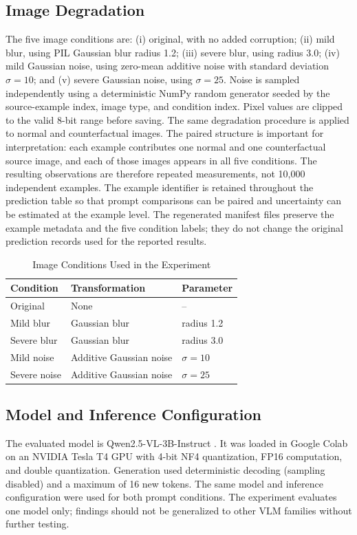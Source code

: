 \documentclass[conference]{IEEEtran}
\begin{document}
\subsection{Image Degradation}
The five image conditions are: (i) original, with no added corruption; (ii) mild blur, using PIL Gaussian blur radius 1.2; (iii) severe blur, using radius 3.0; (iv) mild Gaussian noise, using zero-mean additive noise with standard deviation $\sigma=10$; and (v) severe Gaussian noise, using $\sigma=25$. Noise is sampled independently using a deterministic NumPy random generator seeded by the source-example index, image type, and condition index. Pixel values are clipped to the valid 8-bit range before saving. The same degradation procedure is applied to normal and counterfactual images. The paired structure is important for interpretation: each example contributes one normal and one counterfactual source image, and each of those images appears in all five conditions. The resulting observations are therefore repeated measurements, not 10,000 independent examples. The example identifier is retained throughout the prediction table so that prompt comparisons can be paired and uncertainty can be estimated at the example level. The regenerated manifest files preserve the example metadata and the five condition labels; they do not change the original prediction records used for the reported results.

\begin{table}[t]
\caption{Image Conditions Used in the Experiment}
\label{tab:conditions}
\centering
\footnotesize
\begin{tabular}{lll}
\toprule
Condition & Transformation & Parameter \\
\midrule
Original & None & -- \\
Mild blur & Gaussian blur & radius 1.2 \\
Severe blur & Gaussian blur & radius 3.0 \\
Mild noise & Additive Gaussian noise & $\sigma=10$ \\
Severe noise & Additive Gaussian noise & $\sigma=25$ \\
\bottomrule
\end{tabular}
\end{table}

\subsection{Model and Inference Configuration}
The evaluated model is Qwen2.5-VL-3B-Instruct \cite{bai2025qwen}. It was loaded in Google Colab on an NVIDIA Tesla T4 GPU with 4-bit NF4 quantization, FP16 computation, and double quantization. Generation used deterministic decoding (sampling disabled) and a maximum of 16 new tokens. The same model and inference configuration were used for both prompt conditions. The experiment evaluates one model only; findings should not be generalized to other VLM families without further testing.
\end{document}
